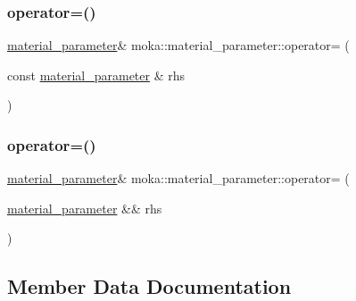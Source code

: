 \mbox{\label{structmoka_1_1material__parameter_a3ffbbae3a4eb694645010647117de3d8}} 
\subsubsection{\texorpdfstring{operator=()}{operator=()}\hspace{0.1cm}{\footnotesize\ttfamily [25/26]}}
{\footnotesize\ttfamily \mbox{\hyperlink{structmoka_1_1material__parameter}{material\+\_\+parameter}}\& moka\+::material\+\_\+parameter\+::operator= (\begin{DoxyParamCaption}\item[{const \mbox{\hyperlink{structmoka_1_1material__parameter}{material\+\_\+parameter}} \&}]{rhs }\end{DoxyParamCaption})}

\mbox{\label{structmoka_1_1material__parameter_a0bf5fe8870459340e2c2c5bdec5fc588}} 
\subsubsection{\texorpdfstring{operator=()}{operator=()}\hspace{0.1cm}{\footnotesize\ttfamily [26/26]}}
{\footnotesize\ttfamily \mbox{\hyperlink{structmoka_1_1material__parameter}{material\+\_\+parameter}}\& moka\+::material\+\_\+parameter\+::operator= (\begin{DoxyParamCaption}\item[{\mbox{\hyperlink{structmoka_1_1material__parameter}{material\+\_\+parameter}} \&\&}]{rhs }\end{DoxyParamCaption})\hspace{0.3cm}{\ttfamily [noexcept]}}



\subsection{Member Data Documentation}
\mbox{\label{structmoka_1_1material__parameter_ad55b26c96a233450607753c895440581}} 
